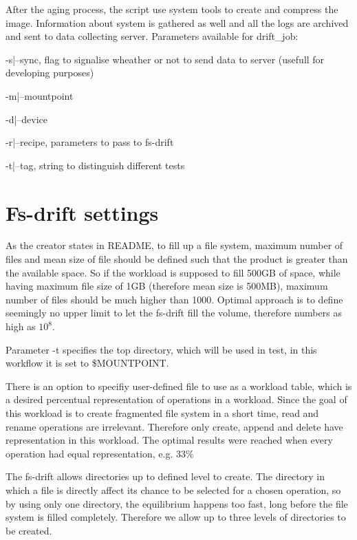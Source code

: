 \documentclass[
  color, %
  table, %
  lof,   %
  lot,   %
]{fithesis3}
\begin{document}
After the aging process, the script use system tools to create and compress the image. Information about system is gathered as well and all the logs are archived and sent to data collecting server.
Parameters available for drift\_job:
\begin{compactenum}
  \item -s|--sync, flag to signalise wheather or not to send data to server (usefull for developing purposes)
  \item -m|--mountpoint
  \item -d|--device
  \item -r|--recipe, parameters to pass to fs-drift
  \item -t|--tag, string to distinguish different tests
  \end{compactenum}

\section{Fs-drift settings}
As the creator states in README, to fill up a file system, maximum number of files and mean size of file should be defined such that the product is greater than the available space. So if the workload is supposed to fill 500GB of space, while having maximum file size of 1GB (therefore mean size is 500MB), maximum number of files should be much higher than 1000. Optimal approach is to define seemingly no upper limit to let the fs-drift fill the volume, therefore numbers as high as $10^8$.

Parameter -t specifies the top directory, which will be used in test, in this workflow it is set to \$MOUNTPOINT.

There is an option to specifiy user-defined file to use as a workload table, which is a desired percentual representation of operations in a workload. Since the goal of this workload is to create fragmented file system in a short time, read and rename operations are irrelevant. Therefore only create, append and delete have representation in this workload. The optimal results were reached when every operation had equal representation, e.g. 33\%

The fs-drift allows directories up to defined level to create. The directory in which a file is directly affect its chance to be selected for a chosen operation, so by using only one directory, the equilibrium happens too fast, long before the file system is filled completely. Therefore we allow up to three levels of directories to be created.
\end{document}
